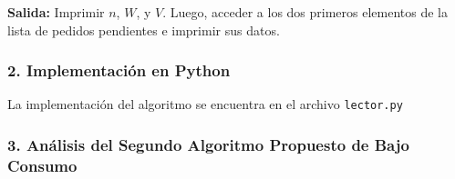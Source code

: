 \begin{enumerate}[label=(\alph*), leftmargin=*]
    \textbf{Salida:} Imprimir $n$, $W$, y $V$. Luego, acceder a los dos primeros elementos de la lista de pedidos pendientes e imprimir sus datos.

    \subsubsection*{2. Implementación en Python}
    
    La implementación del algoritmo se encuentra en el archivo \texttt{lector.py}
\end{enumerate}

\subsubsection*{3. Análisis del Segundo Algoritmo Propuesto de Bajo Consumo}

